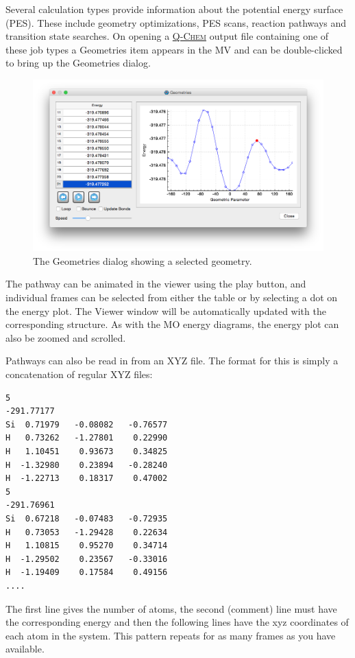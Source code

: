 \documentclass[a4paper,12pt]{article}
\newcommand{\qchem}{\href{http://q-chem.com}{{\scshape Q-Chem}}}
\begin{document}
Several calculation types provide information about the potential energy
surface (PES).  These include geometry optimizations, PES scans, reaction
pathways and transition state searches.  On opening a \qchem{} output file
containing one of these job types a Geometries item appears in the MV and can
be double-clicked to bring up the Geometries dialog.
\begin{figure}[h]
\begin{center}
\includegraphics[scale=0.35]{figures/PesScan.png}
\caption{The Geometries dialog showing a selected geometry. }
\end{center}
\end{figure}

The pathway can be animated in the viewer using the play button, and individual
frames can be selected from either the table or by selecting a dot on the
energy plot.  The Viewer window will be automatically updated with the
corresponding structure.  As with the MO energy diagrams, the energy plot can
also be zoomed and scrolled.

Pathways can also be read in from an XYZ file.  The format for this is simply a
concatenation of regular XYZ files:
{\footnotesize
\begin{verbatim}
5
-291.77177
Si  0.71979   -0.08082   -0.76577  
H   0.73262   -1.27801    0.22990   
H   1.10451    0.93673    0.34825   
H  -1.32980    0.23894   -0.28240  
H  -1.22713    0.18317    0.47002   
5
-291.76961
Si  0.67218   -0.07483   -0.72935  
H   0.73053   -1.29428    0.22634   
H   1.10815    0.95270    0.34714   
H  -1.29502    0.23567   -0.33016  
H  -1.19409    0.17584    0.49156 
....
\end{verbatim}
}
The first line gives the number of atoms, the second (comment) line must have
the corresponding energy and then the following lines have the xyz coordinates
of each atom in the system.  This pattern repeats for as many frames as you have
available.
\end{document}
